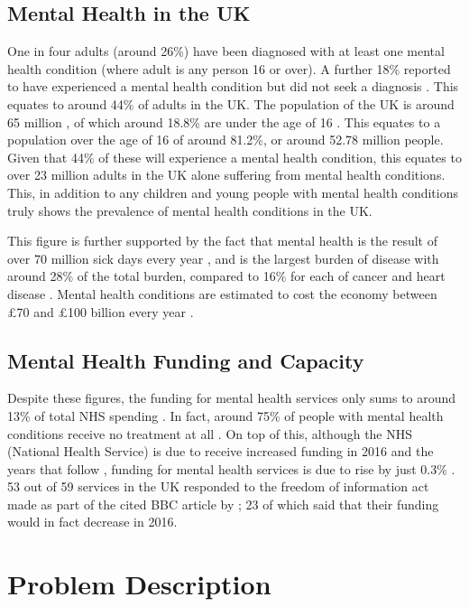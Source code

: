 \documentclass[11pt,openright,a4paper]{report}
\begin{document}
\subsection{Mental Health in the UK}
One in four adults (around 26\%) have been diagnosed with at least one mental health condition \parencite{hse2014} (where adult is any person 16 or over). A further 18\% reported to have experienced a mental health condition but did not seek a diagnosis \parencite{hse2014}. This equates to around 44\% of adults in the UK. The population of the UK is around 65 million \parencite{onspopulation}, of which around 18.8\% are under the age of 16 \parencite{onspopulation}. This equates to a population over the age of 16 of around 81.2\%, or around 52.78 million people. Given that 44\% of these will experience a mental health condition, this equates to over 23 million adults in the UK alone suffering from mental health conditions. This, in addition to any children and young people with mental health conditions truly shows the prevalence of mental health conditions in the UK.

This figure is further supported by the fact that mental health is the result of over 70 million sick days every year \parencite{cmoreport2013}, and is the largest burden of disease with around 28\% of the total burden, compared to 16\% for each of cancer and heart disease \parencite{burdendisorders}. Mental health conditions are estimated to cost the economy between £70 and £100 billion every year \parencite{cmoreport2013}.

\subsection{Mental Health Funding and Capacity}
Despite these figures, the funding for mental health services only sums to around 13\% of total NHS spending \parencite{cepnhsfunding}. In fact, around 75\% of people with mental health conditions receive no treatment at all \parencite{cmoreport2013}. On top of this, although the NHS (National Health Service) is due to receive increased funding in 2016 and the years that follow \parencite{kfnhsbudget}, funding for mental health services is due to rise by just 0.3\% \parencite{mhfunding}. 53 out of 59 services in the UK responded to the freedom of information act made as part of the cited BBC article by \citeauthor{mhfunding}; 23 of which said that their funding would in fact decrease in 2016.

\section{Problem Description}
\end{document}
